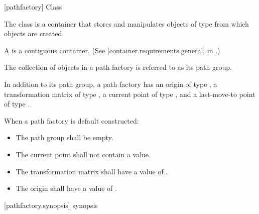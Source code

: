  [pathfactory] {Class }

\pnum
{}
The class  is a container that stores and manipulates objects of type  from which  objects are created.

\pnum
A  is a contiguous container. (See [container.requirements.general] in \cppseventeen.)

\pnum
The collection of  objects in a path factory is referred to as its path group.

\pnum
In addition to its path group, a path factory has an origin of type , a transformation matrix of type , a current point of type , and a last-move-to point of type .

\pnum
When a path factory is default constructed:

\begin{itemize}
	\item The path group shall be empty.
	\item The current point shall not contain a value.
	\item The transformation matrix shall have a value of .
	\item The origin shall have a value of .
\end{itemize}

 [pathfactory.synopsis] { synopsis}

